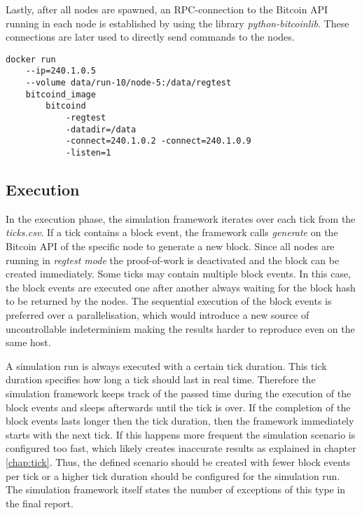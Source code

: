 Lastly, after all nodes are spawned, an RPC-connection to the Bitcoin API running in each node is established by using the library \textit{python-bitcoinlib}.
These connections are later used to directly send commands to the nodes.

\begin{minipage}{\linewidth}
\begin{lstlisting}[caption=Simplified version of how a node is started with \textit{Docker} and \textit{bitcoind}, label={lst:docker_create}, basicstyle=\ttfamily, captionpos=b]
docker run
	--ip=240.1.0.5
	--volume data/run-10/node-5:/data/regtest
	bitcoind_image
		bitcoind
			-regtest
			-datadir=/data
			-connect=240.1.0.2 -connect=240.1.0.9
			-listen=1
\end{lstlisting}
\end{minipage}
	
\subsection{Execution}
\label{chap:simulation_execution}

In the execution phase, the simulation framework iterates over each tick from the \textit{ticks.csv}.
If a tick contains a block event, the framework calls \textit{generate} on the Bitcoin API of the specific node to generate a new block.
Since all nodes are running in \textit{regtest mode} the proof-of-work is deactivated and the block can be created immediately.
Some ticks may contain multiple block events.
In this case, the block events are executed one after another always waiting for the block hash to be returned by the nodes.
The sequential execution of the block events is preferred over a parallelisation, which would introduce a new source of uncontrollable indeterminism making the results harder to reproduce even on the same host.

A simulation run is always executed with a certain tick duration.
This tick duration specifies how long a tick should last in real time.
Therefore the simulation framework keeps track of the passed time during the execution of the block events and sleeps afterwards until the tick is over.
If the completion of the block events lasts longer then the tick duration, then the framework immediately starts with the next tick. %
If this happens more frequent the simulation scenario is configured too fast, which likely creates inaccurate results as explained in chapter \ref{chap:tick}.
Thus, the defined scenario should be created with fewer block events per tick or a higher tick duration should be configured for the simulation run.
The simulation framework itself states the number of exceptions of this type in the final report.

